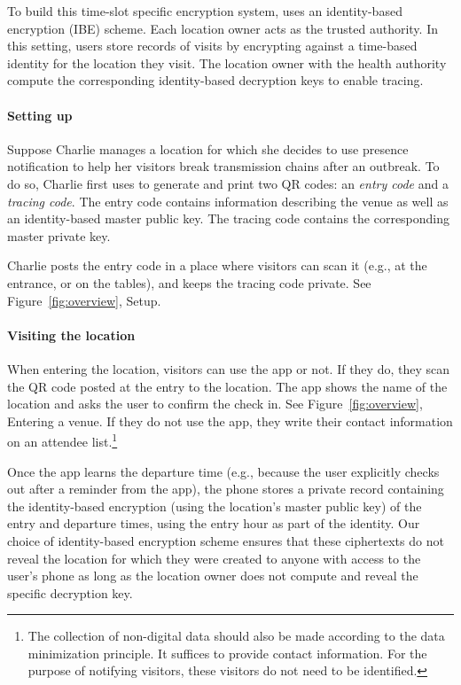 To build this time-slot specific encryption system, \name uses an identity-based encryption (IBE) scheme. Each location owner acts as the trusted authority. In this setting, users store records of visits by encrypting against a time-based identity for the location they visit. The location owner with the health authority compute the corresponding identity-based decryption keys to enable tracing.

\paragraph{Setting up}
Suppose Charlie manages a location for which she decides to use \name presence notification to help her visitors break transmission chains after an outbreak. To do so, Charlie first uses \name to generate and print two QR codes: an \emph{entry code} and a \emph{tracing code}. The entry code contains information describing the venue as well as an identity-based master public key. The tracing code contains the corresponding master private key.

Charlie posts the entry code in a place where visitors can scan it (e.g., at the entrance, or on the tables), and keeps the tracing code private. See Figure~\ref{fig:overview}, Setup.

\paragraph{Visiting the location}
When entering the location, visitors can use the app or not. If they do, they scan the QR code posted at the entry to the location. The app shows the name of the location and asks the user to confirm the check in.
See Figure~\ref{fig:overview}, Entering a venue. If they do not use the app, they write their contact information on an attendee list.\footnote{The collection of non-digital data should also be made according to the data minimization principle. It suffices to provide contact information. For the purpose of notifying visitors, these visitors do not need to be identified.}

Once the app learns the departure time (e.g., because the user explicitly checks out after a reminder from the app), the phone stores a private record containing the identity-based encryption (using the location's master public key) of the entry and departure times, using the entry hour as part of the identity.
Our choice of identity-based encryption scheme ensures that these ciphertexts do not reveal the location for which they were created to anyone with access to the user's phone as long as the location owner does not compute and reveal the specific decryption key.



